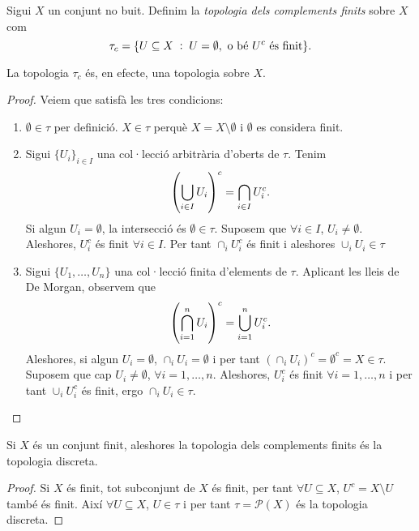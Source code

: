 \documentclass[../main.tex]{subfiles}
\begin{document}
\begin{defi}
\label{def:topologiadelscomplementsfinits} Sigui $X$ un conjunt no buit. Definim la \textit{topologia dels complements finits} sobre $X$ com
\begin{equation}
    \notag
    \tau_c = \{U\subseteq X\;:\;U = \emptyset,\text{ o bé $U^c$ és finit}\} .
\end{equation}
\end{defi}

\begin{prop}
\label{prop:topologiadelscomplementsfinits} La topologia $\tau_c$ és, en efecte, una topologia sobre $X$.
\end{prop}
\begin{proof}
Veiem que satisfà les tres condicions:
\begin{enumerate}[(1)]
    \item $\emptyset\in\tau$ per definició. $X\in\tau$ perquè $X = X\setminus\emptyset$ i $\emptyset$ es considera finit.
    \item Sigui $\{U_i\}_{i\in I}$ una col·lecció arbitrària d'oberts de $\tau$. Tenim
    \begin{equation}
        \notag
        \left(\bigcup_{i\in I}U_i\right)^c = \bigcap_{i\in I}U_i^c.
    \end{equation}
    Si algun $U_i = \emptyset$, la intersecció és $\emptyset\in\tau$. Suposem que $\forall i\in I$, $U_i\not=\emptyset$. Aleshores, $U_i^c$ és finit $\forall i\in I$.  Per tant $\cap_i U_i^c$ és finit i aleshores $\cup_i U_i\in\tau$
    \item Sigui $\{U_1,\ldots,U_n\}$ una col·lecció finita d'elements de $\tau$. Aplicant les lleis de De Morgan, observem que
    \begin{equation}
        \notag
        \left(\bigcap_{i=1}^n U_i\right)^c = \bigcup_{i=1}^n U_i^c.
    \end{equation}
    Aleshores, si algun $U_i=\emptyset$, $\cap_i U_i = \emptyset$ i per tant $(\cap_i U_i)^c = \emptyset^c = X\in\tau$. Suposem que cap $U_i\not=\emptyset$, $\forall i=1,\ldots, n$. Aleshores, $U_i^c$ és finit $\forall i=1,\ldots,n$ i per tant $\cup_i U_i^c$ és finit, ergo $\cap_i U_i\in\tau$.
\end{enumerate}
\end{proof}

\begin{prop}
\label{prop:complementsfinitsigualadiscreta} Si $X$ és un conjunt finit, aleshores la topologia dels complements finits és la topologia discreta.
\end{prop}
\begin{proof}
Si $X$ és finit, tot subconjunt de $X$ és finit, per tant $\forall U\subseteq X$, $U^c = X\setminus U$ també és finit. Així $\forall U\subseteq X$, $U\in\tau$ i per tant $\tau = \mathscr{P}(X)$ és la topologia discreta.
\end{proof}
\end{document}
